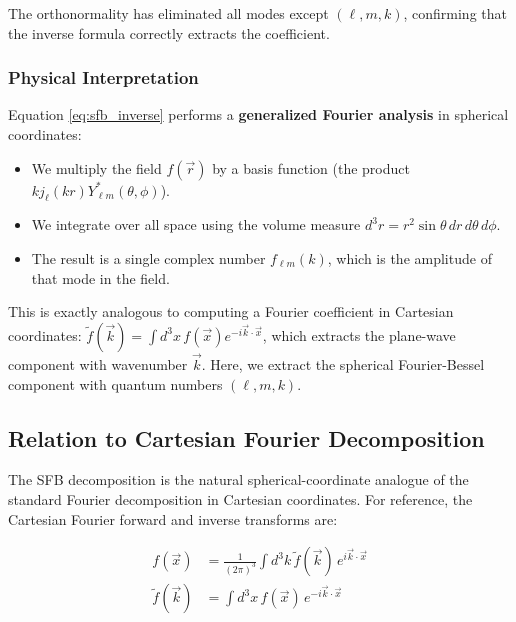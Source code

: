 The orthonormality has eliminated all modes except $(\ell, m, k)$, confirming that the inverse formula correctly extracts the coefficient.

\subsubsection{Physical Interpretation}

Equation \eqref{eq:sfb_inverse} performs a \textbf{generalized Fourier analysis} in spherical coordinates:
\begin{itemize}
    \item We multiply the field $f(\vec{r})$ by a basis function (the product $k j_\ell(kr) Y_{\ell m}^*(\theta, \phi)$).
    \item We integrate over all space using the volume measure $d^3r = r^2 \sin\theta \, dr \, d\theta \, d\phi$.
    \item The result is a single complex number $f_{\ell m}(k)$, which is the amplitude of that mode in the field.
\end{itemize}

This is exactly analogous to computing a Fourier coefficient in Cartesian coordinates: $\tilde{f}(\vec{k}) = \int d^3x \, f(\vec{x}) e^{-i\vec{k}\cdot\vec{x}}$, which extracts the plane-wave component with wavenumber $\vec{k}$. Here, we extract the spherical Fourier-Bessel component with quantum numbers $(\ell, m, k)$.

\subsection{Relation to Cartesian Fourier Decomposition}

The SFB decomposition is the natural spherical-coordinate analogue of the standard Fourier decomposition in Cartesian coordinates. For reference, the Cartesian Fourier forward and inverse transforms are:

\begin{align}
f(\vec{x}) &= \frac{1}{(2\pi)^3} \int d^3 k \, \tilde{f}(\vec{k}) \, e^{i\vec{k}\cdot\vec{x}} \label{eq:fourier_forward} \\
\tilde{f}(\vec{k}) &= \int d^3 x \, f(\vec{x}) \, e^{-i\vec{k}\cdot\vec{x}} \label{eq:fourier_inverse}
\end{align}

